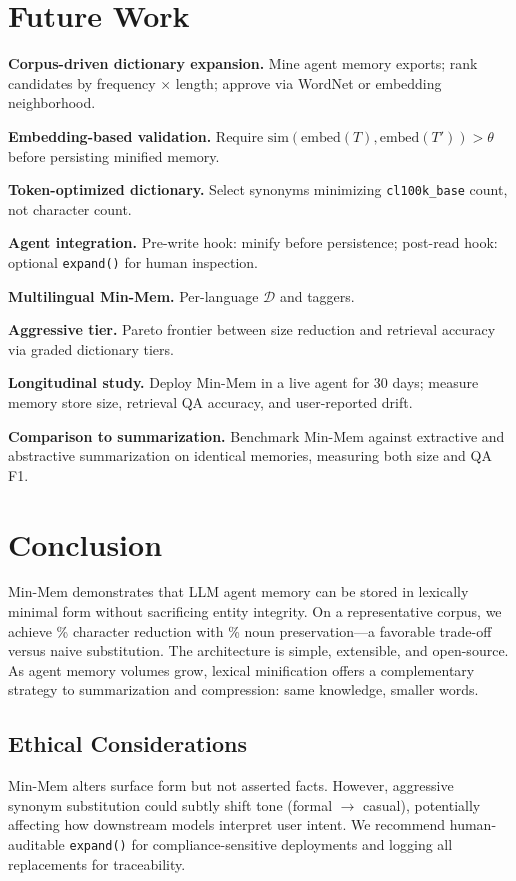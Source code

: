 \documentclass[10pt,twocolumn]{article}
\begin{document}
\section{Future Work}

\textbf{Corpus-driven dictionary expansion.} Mine agent memory exports; rank candidates by frequency $\times$ length; approve via WordNet or embedding neighborhood.

\textbf{Embedding-based validation.} Require $\text{sim}(\text{embed}(T), \text{embed}(T')) > \theta$ before persisting minified memory.

\textbf{Token-optimized dictionary.} Select synonyms minimizing \texttt{cl100k\_base} count, not character count.

\textbf{Agent integration.} Pre-write hook: minify before persistence; post-read hook: optional \texttt{expand()} for human inspection.

\textbf{Multilingual Min-Mem.} Per-language $\mathcal{D}$ and taggers.

\textbf{Aggressive tier.} Pareto frontier between size reduction and retrieval accuracy via graded dictionary tiers.

\textbf{Longitudinal study.} Deploy Min-Mem in a live agent for 30 days; measure memory store size, retrieval QA accuracy, and user-reported drift.

\textbf{Comparison to summarization.} Benchmark Min-Mem against extractive and abstractive summarization on identical memories, measuring both size and QA F1.

\section{Conclusion}

Min-Mem demonstrates that LLM agent memory can be stored in lexically minimal form without sacrificing entity integrity. On a representative corpus, we achieve \MinMemCharSavings\% character reduction with \MinMemNounPres\% noun preservation---a favorable trade-off versus naive substitution. The architecture is simple, extensible, and open-source. As agent memory volumes grow, lexical minification offers a complementary strategy to summarization and compression: same knowledge, smaller words.

\subsection{Ethical Considerations}

Min-Mem alters surface form but not asserted facts. However, aggressive synonym substitution could subtly shift tone (formal $\rightarrow$ casual), potentially affecting how downstream models interpret user intent. We recommend human-auditable \texttt{expand()} for compliance-sensitive deployments and logging all replacements for traceability.
\end{document}
